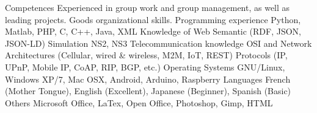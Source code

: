 \begin{cvskills}
  \cvskill
    {Competences}
    {Experienced in group work and group management, as well as leading projects.}
  \cvskill
    {}
    {Goods organizational skills.}
  \cvskill
    {Programming experience}
    {Python, Matlab, PHP, C, C++, Java, XML}
  \cvskill
    {Knowledge of}
    {Web Semantic (RDF, JSON, JSON-LD)}
  \cvskill
    {Simulation}
    {NS2, NS3}
  \cvskill
    {Telecommunication knowledge}
    {OSI and Network Architectures (Cellular, wired \& wireless, M2M, IoT, REST)}
  \cvskill
  	{}
  	{Protocols (IP, UPnP, Mobile IP, CoAP, RIP, BGP, etc.)}
  \cvskill
    {Operating Systems}
    {GNU/Linux, Windows XP/7, Mac OSX, Android, Arduino, Raspberry}
  \cvskill
    {Languages}
    {French (Mother Tongue), English (Excellent), Japanese (Beginner), Spanish (Basic)}
  \cvskill
    {Others}
    {Microsoft Office, LaTex, Open Office, Photoshop, Gimp, HTML}
\end{cvskills}
